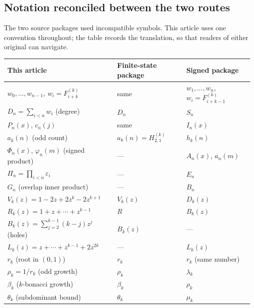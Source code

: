 \documentclass[11pt,letterpaper]{article}
\numberwithin{equation}{section}
\theoremstyle{definition}
\theoremstyle{remark}
\newcommand{\eps}{\varepsilon}
\begin{document}
\subsection{Notation reconciled between the two routes}
\label{sec:notation}

The two source packages used incompatible symbols. This article uses one
convention throughout; the table records the translation, so that readers of
either original can navigate.

\begin{center}
\renewcommand{\arraystretch}{1.12}
\begin{tabular}{lll}
\toprule
This article & Finite-state package & Signed package\\
\midrule
$w_0,\ldots,w_{n-1}$, $w_i=F^{(k)}_{i+k}$ & same & $w_1,\ldots,w_n$, $w_i=F^{(k)}_{i+k-1}$\\
$D_n=\sum_{i<n}w_i$ (degree) & $D_n$ & $S_n$\\
$P_n(x)$, $c_n(j)$ & same & $I_n(x)$\\
$a_k(n)$ (odd count) & $a_k(n)=H^{(k)}_{2,1}$ & $h_k(n)$\\
$\Phi_n(x)$, $\varphi_n(m)$ (signed product) & --- & $A_n(x)$, $a_n(m)$\\
$\Pi_n=\prod_{i<n}\eps_i$ & --- & $E_n$\\
$G_n$ (overlap inner product) & --- & $B_n$\\
$V_k(z)=1-2z+2z^k-2z^{k+1}$ & $V_k(z)$ & $D_k(z)$\\
$R_k(z)=1+z+\cdots+z^{k-1}$ & $R$ & $B_k(z)$\\
$B_k(z)=\sum_{j=2}^{k-1}(k-j)z^j$ (holes) & $B_k(z)$ & ---\\
$L_k(z)=z+\cdots+z^{k-1}+2z^{2k}$ & --- & $L_k(z)$\\
$r_k$ (root in $(0,1)$) & $r_k$ & $r_k$ (same number)\\
$\rho_k=1/r_k$ (odd growth) & $\rho_k$ & $\lambda_k$\\
$\beta_k$ ($k$-bonacci growth) & $\beta_k$ & $\rho_k$\\
$\theta_k$ (subdominant bound) & $\theta_k$ & $\mu_k$\\
\bottomrule
\end{tabular}
\end{center}
\end{document}
